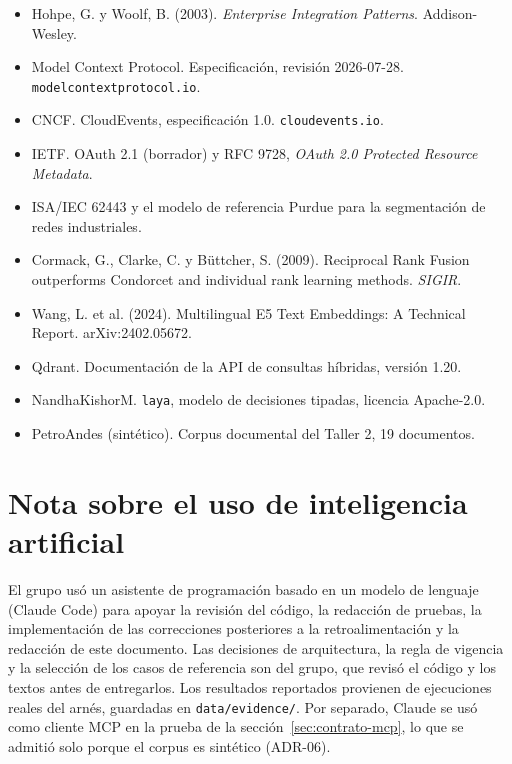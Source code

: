 \begin{itemize}
  \item Hohpe, G. y Woolf, B. (2003). \emph{Enterprise Integration Patterns}. Addison-Wesley.
  \item Model Context Protocol. Especificación, revisión 2026-07-28. \texttt{modelcontextprotocol.io}.
  \item CNCF. CloudEvents, especificación 1.0. \texttt{cloudevents.io}.
  \item IETF. OAuth 2.1 (borrador) y RFC 9728, \emph{OAuth 2.0 Protected Resource Metadata}.
  \item ISA/IEC 62443 y el modelo de referencia Purdue para la segmentación de redes industriales.
  \item Cormack, G., Clarke, C. y Büttcher, S. (2009). Reciprocal Rank Fusion outperforms Condorcet and individual rank learning methods. \emph{SIGIR}.
  \item Wang, L. et al. (2024). Multilingual E5 Text Embeddings: A Technical Report. arXiv:2402.05672.
  \item Qdrant. Documentación de la API de consultas híbridas, versión 1.20.
  \item NandhaKishorM. \texttt{laya}, modelo de decisiones tipadas, licencia Apache-2.0.
  \item PetroAndes (sintético). Corpus documental del Taller 2, 19 documentos.
\end{itemize}

\section{Nota sobre el uso de inteligencia artificial}

El grupo usó un asistente de programación basado en un modelo de lenguaje (Claude Code) para apoyar la revisión del código, la redacción de pruebas, la implementación de las correcciones posteriores a la retroalimentación y la redacción de este documento. Las decisiones de arquitectura, la regla de vigencia y la selección de los casos de referencia son del grupo, que revisó el código y los textos antes de entregarlos. Los resultados reportados provienen de ejecuciones reales del arnés, guardadas en \texttt{data/evidence/}. Por separado, Claude se usó como cliente MCP en la prueba de la sección~\ref{sec:contrato-mcp}, lo que se admitió solo porque el corpus es sintético (ADR-06).
